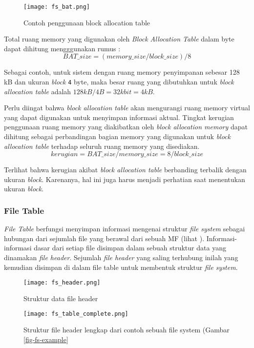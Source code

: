 \begin{figure}[t]
\centering
\texttt{[image: fs\_bat.png]}
\caption{Contoh penggunaan block allocation table}
\label{fig-bat}
\end{figure}

Total ruang memory yang digunakan oleh {\em Block Allocation Table} dalam byte dapat dihitung mengggunakan rumus :
$$
BAT\_size=(memory\_size/block\_size)/8
$$

Sebagai contoh, untuk sistem dengan ruang memory penyimpanan sebesar 128 kB dan ukuran {\em block} {\tt 4} byte, maka besar ruang yang dibutuhkan untuk {\em block allocation table} adalah $128kB/4B=32kbit=4kB$.

Perlu diingat bahwa {\em block allocation table} akan mengurangi ruang memory virtual yang dapat digunakan untuk menyimpan informasi aktual. Tingkat kerugian penggunaan ruang memory yang diakibatkan oleh {\em block allocation memory} dapat dihitung sebagai perbandingan bagian memory yang digunakan untuk {\em block allocation table} terhadap seluruh ruang memory yang disediakan.
$$
kerugian=BAT\_size/memory\_size=8/block\_size
$$

Terlihat bahwa kerugian akibat {\em block allocation table} berbanding terbalik dengan ukuran {\em block}. Karenanya, hal ini juga harus menjadi perhatian saat menentukan ukuran {\em block}.

\subsubsection{File Table}
\label{file-table}

{\em File Table} berfungsi menyimpan informasi mengenai struktur {\em file system} sebagai hubungan dari sejumlah file yang berawal dari sebuah MF (lihat ). Informasi-informasi dasar dari setiap file disimpan dalam sebuah struktur data yang dinamakan {\em file header}. Sejumlah {\em file header} yang saling terhubung inilah yang kemudian disimpan di dalam file table untuk membentuk struktur {\em file system}.

\begin{figure}[h]
\centering
\texttt{[image: fs\_header.png]}
\caption{Struktur data file header}
\label{fig-header-field}
\end{figure}

\begin{figure}
\centering
\texttt{[image: fs\_table\_complete.png]}
\caption{Struktur file header lengkap dari contoh sebuah file system (Gambar \ref{fig-fs-example}}
\label{fig-header-complete}
\end{figure}

